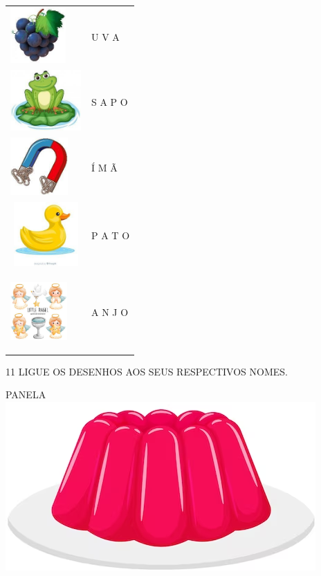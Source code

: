 \begin{tabular}{ll}
\includegraphics[width=0.83333in,height=0.84004in]{media/image38.jpg} & U V A \\
\includegraphics[width=1.06463in,height=0.91667in]{media/image39.jpg} & S A P O \\
\includegraphics[width=0.86458in,height=0.86667in]{media/image40.jpg} & Í M Ã \\
\includegraphics[width=1.07292in,height=0.97005in]{media/image41.jpg} & P A  T O \\
\includegraphics[width=0.85417in,height=1.14167in]{media/image42.jpg} & A N J O
\end{tabular}


\pagebreak
\num{11} LIGUE OS DESENHOS AOS SEUS RESPECTIVOS NOMES.

PANELA \hfill\includegraphics[width=.2\textwidth]{media/image43.png}

